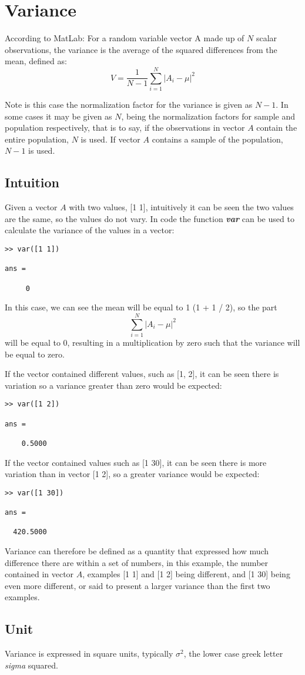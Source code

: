 \section{Variance}
According to MatLab:  
For a random variable vector A made up of $N$ scalar observations, the variance is the average of the squared differences from the mean, defined as:
\begin{equation}
V=\frac{1}{N-1}\sum_{i=1}^N|A_i-\mu|^2  \label{variance} 
\end{equation}



Note is this case the normalization factor for the variance is given as $N-1$. In some cases it may be given as $N$, being the normalization factors for sample and population respectively, that is to say, if the observations in vector $A$ contain the entire population, $N$ is used. If vector $A$ contains a sample of the population, $N-1$ is used.
\subsection{Intuition}
Given a vector $A$ with two values, [1 1], intuitively it can be seen the two values are the same, so the values do not vary. In code the function \textbf{\textit{var}} can be used to calculate the variance of the values in a vector:
\begin{verbatim}
>> var([1 1])

ans =

     0
\end{verbatim}
In this case, we can see the mean will be equal to 1 (1 + 1 / 2), so the part
$$
\sum_{i=1}^N|A_i-\mu|^2
$$
will be equal to 0, resulting in a multiplication by zero such that the variance will be equal to zero.

If the vector contained different values, such as [1, 2], it can be seen there is variation so a variance greater than zero would be expected:
\begin{verbatim}
>> var([1 2])

ans =

    0.5000    
\end{verbatim}
If the vector contained values such as [1 30], it can be seen there is more variation than in vector [1 2], so a greater variance would be expected:
\begin{verbatim}
>> var([1 30])

ans =

  420.5000  
\end{verbatim}
Variance can therefore be defined as a quantity that expressed how much difference there are within a set of numbers, in this example, the number contained in vector $A$, examples [1 1] and [1 2] being different, and [1 30] being even more different, or said to present a larger variance than the first two examples.
\subsection{Unit}
Variance is expressed in square units, typically $\sigma^2$, the lower case greek letter \textit{sigma} squared.





